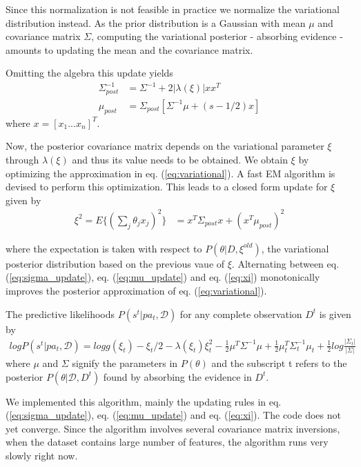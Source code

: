 Since this normalization is not feasible in practice we normalize the variational distribution instead. As the prior distribution is a Gaussian with mean $\mu$ and covariance matrix $\Sigma$, computing the variational posterior - absorbing evidence - amounts to updating the mean and the covariance matrix. 

Omitting the algebra this update yields 
\begin{align}
\label{eq:sigma_update}
\Sigma^{-1}_{post} &= \Sigma^{-1} + 2|\lambda(\xi)|xx^T\\
\label{eq:mu_update}
\mu_{post} &= \Sigma_{post}[\Sigma^{-1}\mu + (s - 1/2)x]
\end{align}
where $x = [x_1 ...x_n]^T$. 

Now, the posterior covariance matrix depends on the variational parameter $\xi$ through $\lambda(\xi)$ and thus its value needs to be obtained. We obtain $\xi$ by optimizing the approximation in eq. (\ref{eq:variational}). A fast EM algorithm is devised to perform this optimization. This leads to a closed form update for $\xi$ given by 
\begin{align}
\label{eq:xi}
\xi^2 = E\{(\sum_j\theta_jx_j)^2\} &= x^T\Sigma_{post}x + (x^T\mu_{post})^2
\end{align}

where the expectation is taken with respect to $P(\theta|D, \xi^{old})$, the variational posterior distribution based on the previous vaue of $\xi$. Alternating between eq. (\ref{eq:sigma_update}), eq. (\ref{eq:mu_update}) and eq. (\ref{eq:xi}) monotonically improves the posterior approximation of eq. (\ref{eq:variational}).

The predictive likelihoods $P(s^t | pa_t, \mathcal{D})$ for any complete observation $D^t$ is given by
\begin{align}
  logP(s^t|pa_t, \mathcal{D}) = logg(\xi_t) - \xi_t/2 - \lambda(\xi_t)\xi_t^2 - \frac{1}{2}\mu^T\Sigma^{-1}\mu + \frac{1}{2}\mu^T_t\Sigma^{-1}_t\mu_t + \frac{1}{2}log\frac{|\Sigma_t|}{|\Sigma|}
\end{align}
where $\mu$ and $\Sigma$ signify the parameters in $P(\theta)$ and the subscript t refers to the posterior $P(\theta|\mathcal{D}, D^t)$ found by absorbing the evidence in $D^t$.

We implemented this algorithm, mainly the updating rules in eq. (\ref{eq:sigma_update}), eq. (\ref{eq:mu_update}) and eq. (\ref{eq:xi}). The code does not yet converge. Since the algorithm involves several covariance matrix inversions, when the dataset contains large number of features, the algorithm runs very slowly right now.
